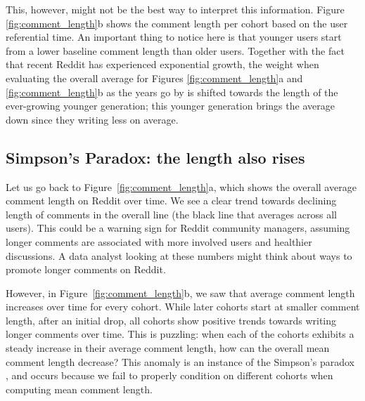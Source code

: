 This, however, might not be the best way to interpret this information. Figure \ref{fig:comment_length}b shows the comment length per cohort based on the user referential time. An important thing to notice here is that younger users start from a lower baseline comment length than older users. Together with the fact that recent Reddit has experienced exponential growth, the weight when evaluating the overall average for Figures \ref{fig:comment_length}a and \ref{fig:comment_length}b as the years go by is shifted towards the length of the ever-growing younger generation; this younger generation brings the average down since they writing less on average.

\subsection{Simpson's Paradox: the length also rises}

Let us go back to Figure~\ref{fig:comment_length}a, which shows the overall average comment length on Reddit over time. We see a clear trend towards declining length of comments in the overall line (the black line that averages across all users).
This could be a warning sign for Reddit community managers, assuming longer comments are associated with more involved users and healthier discussions. A data analyst looking at these numbers might think about ways to promote longer comments on Reddit. 

However, in Figure~\ref{fig:comment_length}b, we saw that average comment length increases over time for every cohort. While later cohorts start at smaller comment length, after an initial drop, all cohorts show positive trends towards writing longer comments over time.  This is puzzling: when each of the cohorts exhibits a steady increase in their average comment length, how can the overall mean comment length decrease?  This anomaly is an instance of the Simpson's paradox \cite{simpson1951}, and occurs because we fail to properly condition on different cohorts when computing mean comment length. 


